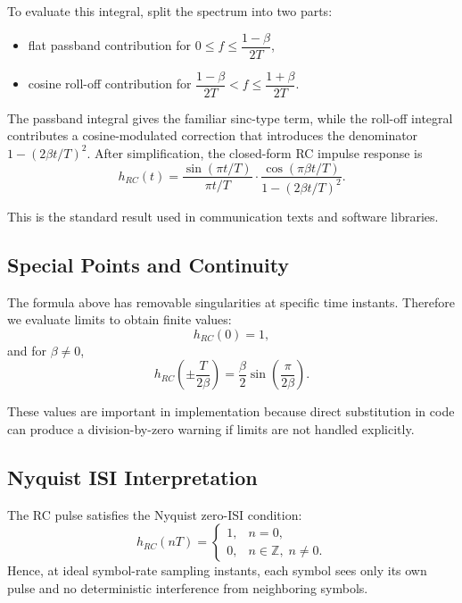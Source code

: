 \documentclass{article}
\begin{document}
To evaluate this integral, split the spectrum into two parts:
\begin{itemize}
\item[$\rightarrow$] flat passband contribution for $0\le f\le \dfrac{1-\beta}{2T}$,
\item[$\rightarrow$] cosine roll-off contribution for $\dfrac{1-\beta}{2T}<f\le \dfrac{1+\beta}{2T}$.
\end{itemize}

The passband integral gives the familiar sinc-type term, while the roll-off integral contributes a cosine-modulated correction that introduces the denominator $1-(2\beta t/T)^2$. After simplification, the closed-form RC impulse response is
\begin{equation*}
h_{RC}(t)=\frac{\sin(\pi t/T)}{\pi t/T}\cdot\frac{\cos(\pi\beta t/T)}{1-(2\beta t/T)^2}.
\end{equation*}

This is the standard result used in communication texts and software libraries.

\subsection*{Special Points and Continuity}
The formula above has removable singularities at specific time instants. Therefore we evaluate limits to obtain finite values:
\begin{equation*}
h_{RC}(0)=1,
\end{equation*}
and for $\beta\neq 0$,
\begin{equation*}
h_{RC}\left(\pm\frac{T}{2\beta}\right)=\frac{\beta}{2}\sin\left(\frac{\pi}{2\beta}\right).
\end{equation*}

These values are important in implementation because direct substitution in code can produce a division-by-zero warning if limits are not handled explicitly.

\subsection*{Nyquist ISI Interpretation}
The RC pulse satisfies the Nyquist zero-ISI condition:
\begin{equation*}
h_{RC}(nT)=
\begin{cases}
1, & n=0,\\
0, & n\in\mathbb{Z},\;n\neq 0.
\end{cases}
\end{equation*}
Hence, at ideal symbol-rate sampling instants, each symbol sees only its own pulse and no deterministic interference from neighboring symbols.
\end{document}
